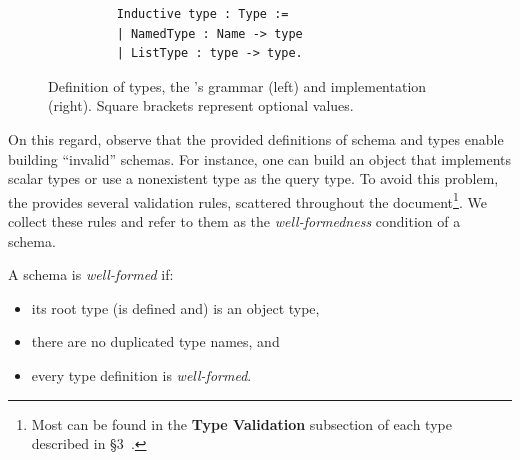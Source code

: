 \begin{figure}[h]
\begin{subfigure}{.5\textwidth}
\begin{verbatim}
    Inductive type : Type :=
    | NamedType : Name -> type
    | ListType : type -> type.
    \end{verbatim}

    \end{subfigure}
    \caption{Definition of \gql types, the \spec's grammar (left) and \coq implementation (right). Square brackets represent optional values. }
    \label{fig:types_def}
\end{figure}




On this regard, observe that the provided definitions of schema and types enable building ``invalid'' schemas. For instance, one can build an object that implements scalar types or use a nonexistent type as the query type. To avoid this problem, the \spec provides several validation rules, scattered throughout the document\footnote{Most can be found in the \textbf{Type Validation} subsection of each type described in \S3~\cite{gqlspec}.}.  We collect these rules and refer to them as the \textit{well-formedness} condition of a \gql schema.


\begin{definition}
A \gql schema is \textit{well-formed} if: 
\begin{itemize}
    \item its root type (is defined and) is an object type, 
    \item there are no duplicated type names, and
    \item every type definition is \textit{well-formed}.
\end{itemize}
\end{definition}

